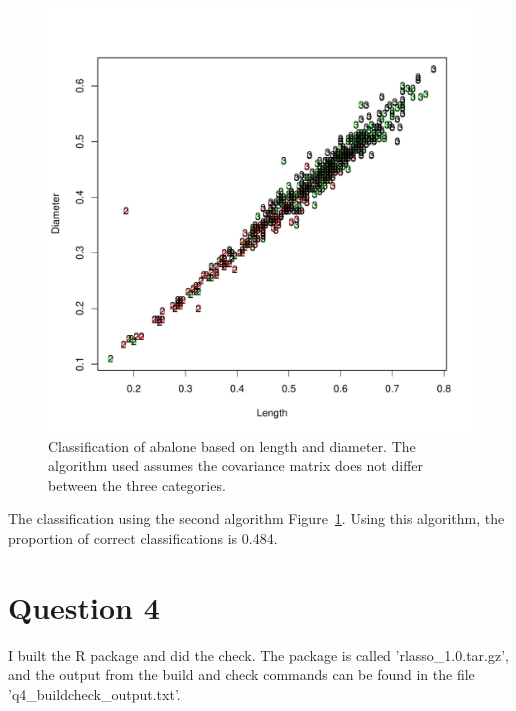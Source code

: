 \documentclass{article}\usepackage[]{graphicx}\usepackage[]{color}
\makeatletter
\def\maxwidth{ %
  \ifdim\Gin@nat@width>\linewidth
    \linewidth
  \else
    \Gin@nat@width
  \fi
}
\newenvironment{knitrout}{}{} %
\makeatother
\begin{document}
\begin{knitrout}
\color{fgcolor}\begin{figure}
\includegraphics[width=\maxwidth]{figure/em_plot2-1} \caption[Classification of abalone based on length and diameter]{Classification of abalone based on length and diameter.  The algorithm used assumes the covariance matrix does not differ between the three categories.}\label{fig:em_plot2}
\end{figure}


\end{knitrout}

The classification using the second algorithm Figure~\ref{fig:em_plot2}.  Using this algorithm, the proportion of correct classifications is 0.484.



\section*{Question 4}
I built the R package and did the check.  The package is called 'rlasso\_1.0.tar.gz', and the output from the build and check commands can be found in the file 'q4\_buildcheck\_output.txt'.
\end{document}
